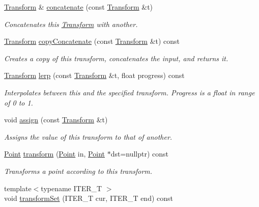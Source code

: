 \begin{DoxyCompactItemize}
\hyperlink{classcturtle_1_1Transform}{Transform} \& \hyperlink{classcturtle_1_1Transform_add9d96d9ea677c39e2c6133e7f133aff}{concatenate} (const \hyperlink{classcturtle_1_1Transform}{Transform} \&t)
\begin{DoxyCompactList}\small\item\em Concatenates this \hyperlink{classcturtle_1_1Transform}{Transform} with another. \end{DoxyCompactList}\item 
\hyperlink{classcturtle_1_1Transform}{Transform} \hyperlink{classcturtle_1_1Transform_a52442d40b46368002c318f2167ff3db4}{copy\+Concatenate} (const \hyperlink{classcturtle_1_1Transform}{Transform} \&t) const
\begin{DoxyCompactList}\small\item\em Creates a copy of this transform, concatenates the input, and returns it. \end{DoxyCompactList}\item 
\hyperlink{classcturtle_1_1Transform}{Transform} \hyperlink{classcturtle_1_1Transform_aafca536c5297631923db197c225e8bf5}{lerp} (const \hyperlink{classcturtle_1_1Transform}{Transform} \&t, float progress) const
\begin{DoxyCompactList}\small\item\em Interpolates between this and the specified transform. Progress is a float in range of 0 to 1. \end{DoxyCompactList}\item 
void \hyperlink{classcturtle_1_1Transform_a5eb270c2614cc18c23623b24feb6968e}{assign} (const \hyperlink{classcturtle_1_1Transform}{Transform} \&t)
\begin{DoxyCompactList}\small\item\em Assigns the value of this transform to that of another. \end{DoxyCompactList}\item 
\hyperlink{structcturtle_1_1ivec2}{Point} \hyperlink{classcturtle_1_1Transform_aa8631732daaddc8336ed29f5462d1fef}{transform} (\hyperlink{structcturtle_1_1ivec2}{Point} in, \hyperlink{structcturtle_1_1ivec2}{Point} $\ast$dst=nullptr) const
\begin{DoxyCompactList}\small\item\em Transforms a point according to this transform. \end{DoxyCompactList}\item 
{\footnotesize template$<$typename I\+T\+E\+R\+\_\+T $>$ }\\void \hyperlink{classcturtle_1_1Transform_aae183c07fb323d0dfe8b3d633d59415c}{transform\+Set} (I\+T\+E\+R\+\_\+T cur, I\+T\+E\+R\+\_\+T end) const

\end{DoxyCompactItemize}

